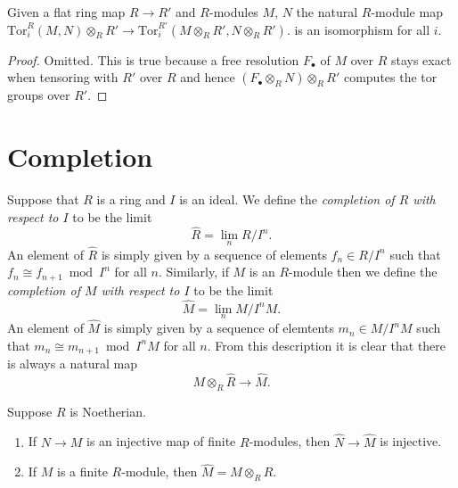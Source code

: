 \begin{lemma}
\label{lemma-flat-base-change-tor}
Given a flat ring map $R \to R'$ and $R$-modules
$M$, $N$ the natural $R$-module map
$\text{Tor}_i^R(M, N)\otimes_R R'
\to \text{Tor}_i^{R'}(M \otimes_R R', N\otimes_R R')$.
is an isomorphism for all $i$.
\end{lemma}

\begin{proof}
Omitted. This is true because a free resolution $F_\bullet$ of $M$ over
$R$ stays exact when tensoring with $R'$ over $R$ and hence
$(F_\bullet \otimes_R N)\otimes_R R'$ computes the tor groups
over $R'$.
\end{proof}


















\section{Completion}
\label{section-completion}

\noindent
Suppose that $R$ is a ring and $I$ is an ideal.
We define the {\it completion of $R$ with respect to $I$}
to be the limit
$$
\hat R = \lim_{n} R/I^n.
$$
An element of $\hat R$ is simply given by a sequence
of elements $f_n \in R/I^n$ such that $f_n \cong f_{n + 1} \bmod I^n$
for all $n$. Similarly, if $M$ is an $R$-module then we define the
{\it completion of $M$ with respect to $I$}
to be the limit
$$
\hat M = \lim_{n} M/I^nM.
$$
An element of $\hat M$ is simply given by a sequence of
elemtents $m_n \in M/I^nM$ such that $m_n \cong m_{n + 1} \bmod I^nM$
for all $n$. From this description it is clear that there
is always a natural map
$$
M \otimes_R \hat R
\longrightarrow
\hat M.
$$

\begin{lemma}
\label{lemma-completion-tensor}
Suppose $R$ is Noetherian.
\begin{enumerate}
\item If $N \to M$ is an injective map of finite $R$-modules,
then $\hat N \to \hat M$ is injective.
\item If $M$ is a finite $R$-module, then $\hat M = M \otimes_R \hat R$.
\end{enumerate}
\end{lemma}

